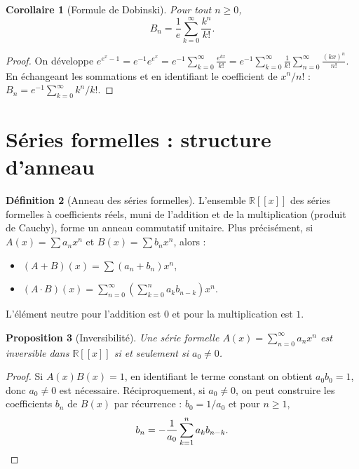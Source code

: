 \documentclass[12pt,a4paper,openany]{book}
\theoremstyle{definition}
\newtheorem{definition}{Définition}[chapter]
\theoremstyle{plain}
\newtheorem{proposition}[definition]{Proposition}
\newtheorem{corollaire}[definition]{Corollaire}
\theoremstyle{remark}
\newcommand{\R}{\mathbb{R}}
\begin{document}
\begin{corollaire}[Formule de Dobinski]
\label{cor:dobinski}
Pour tout $n \geqslant 0$,
\[
  B_n = \frac{1}{e} \sum_{k=0}^{\infty} \frac{k^n}{k!}.
\]
\end{corollaire}

\begin{proof}
On développe $e^{e^x - 1} = e^{-1} e^{e^x} = e^{-1} \sum_{k=0}^\infty \frac{e^{kx}}{k!}
= e^{-1} \sum_{k=0}^\infty \frac{1}{k!} \sum_{n=0}^\infty \frac{(kx)^n}{n!}$.
En échangeant les sommations et en identifiant le coefficient de $x^n/n!$ :
$B_n = e^{-1} \sum_{k=0}^\infty k^n / k!$.
\end{proof}

\section{Séries formelles : structure d'anneau}
\label{sec:series-formelles}

\begin{definition}[Anneau des séries formelles]
\label{def:anneau-series}
L'ensemble $\R[[x]]$\index{$\R[[x]]$} des séries formelles à coefficients réels,
muni de l'addition et de la multiplication (produit de Cauchy), forme un
anneau commutatif unitaire. Plus précisément, si
$A(x) = \sum a_n x^n$ et $B(x) = \sum b_n x^n$, alors :
\begin{itemize}[nosep]
  \item $(A+B)(x) = \sum (a_n + b_n) x^n$,
  \item $(A \cdot B)(x) = \sum_{n=0}^\infty \left(\sum_{k=0}^n a_k b_{n-k}\right) x^n$.
\end{itemize}
L'élément neutre pour l'addition est $0$ et pour la multiplication est $1$.
\end{definition}

\begin{proposition}[Inversibilité]
\label{prop:serie-inverse}
Une série formelle $A(x) = \sum_{n=0}^\infty a_n x^n$ est inversible dans
$\R[[x]]$ si et seulement si $a_0 \neq 0$.
\end{proposition}

\begin{proof}
Si $A(x) B(x) = 1$, en identifiant le terme constant on obtient $a_0 b_0 = 1$,
donc $a_0 \neq 0$ est nécessaire. Réciproquement, si $a_0 \neq 0$, on peut
construire les coefficients $b_n$ de $B(x)$ par récurrence :
$b_0 = 1/a_0$ et pour $n \geqslant 1$,
\[
  b_n = -\frac{1}{a_0}\sum_{k=1}^{n} a_k b_{n-k}. \qedhere
\]
\end{proof}
\end{document}

